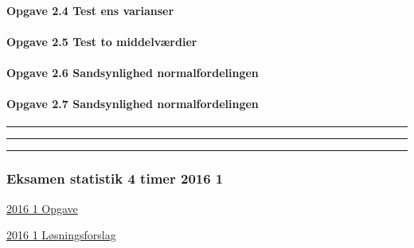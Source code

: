 \documentclass[]{book}
\let\oldparagraph\paragraph
\renewcommand{\paragraph}[1]{\oldparagraph{#1}\mbox{}}
\begin{document}
\hypertarget{opgave-2.4-test-ens-varianser}{%
\paragraph{Opgave 2.4 Test ens varianser}\label{opgave-2.4-test-ens-varianser}}

\hypertarget{opgave-2.5-test-to-middelvrdier}{%
\paragraph{Opgave 2.5 Test to middelværdier}\label{opgave-2.5-test-to-middelvrdier}}

\hypertarget{opgave-2.6-sandsynlighed-normalfordelingen}{%
\paragraph{Opgave 2.6 Sandsynlighed normalfordelingen}\label{opgave-2.6-sandsynlighed-normalfordelingen}}

\hypertarget{opgave-2.7-sandsynlighed-normalfordelingen}{%
\paragraph{Opgave 2.7 Sandsynlighed normalfordelingen}\label{opgave-2.7-sandsynlighed-normalfordelingen}}

\begin{center}\rule{0.5\linewidth}{\linethickness}\end{center}

\begin{center}\rule{0.5\linewidth}{\linethickness}\end{center}

\begin{center}\rule{0.5\linewidth}{\linethickness}\end{center}

\hypertarget{eksamen-statistik-4-timer-2016-1}{%
\subsubsection{Eksamen statistik 4 timer 2016 1}\label{eksamen-statistik-4-timer-2016-1}}

\href{https://www.dropbox.com/s/t1h9o0xnutneavu/AU\%20Statistik\%20eksamensopgave\%20-\%20januar\%202016.pdf?dl=1}{2016 1 Opgave}

\href{https://www.dropbox.com/s/vk2igqyofts6fes/AU\%20Statistik\%20eksamensopgave\%20-\%20januar\%202016\%20l\%C3\%B8sningsforslag.docx?dl=1}{2016 1 Løsningsforslag}
\end{document}
